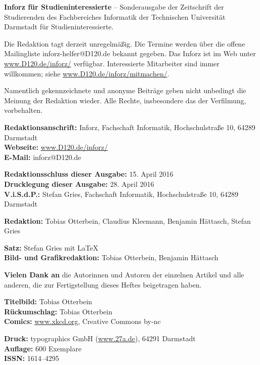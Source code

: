 \small

\textbf{Inforz für Studieninteressierte \the\year} – Sonderausgabe der Zeitschrift der Studierenden des Fachbereiches Informatik der Technischen Universität Darmstadt für Studieninteressierte.

\vspace{4mm}
Die Redaktion tagt derzeit unregelmäßig. Die Termine werden über die offene Mailingliste inforz-helfer@D120.de bekannt gegeben. Das Inforz ist  im Web unter \url{www.D120.de/inforz/} verfügbar. Interessierte Mitarbeiter sind immer willkommen; siehe  \url{www.D120.de/inforz/mitmachen/}.

\vspace{4mm}
Namentlich gekennzeichnete und anonyme Beiträge geben nicht unbedingt die Meinung der Redaktion wieder. Alle Rechte, insbesondere das der Verfilmung, vorbehalten.


\textbf{Redaktionsanschrift:} Inforz, Fachschaft Informatik, Hochschulstraße 10, 64289 Darmstadt\\
\textbf{Webseite:} \url{www.D120.de/inforz/}\\
\textbf{E-Mail:} inforz@D120.de

\vspace{4mm}
\textbf{Redaktionsschluss dieser Ausgabe:} 15. April 2016\\
\textbf{Drucklegung dieser Ausgabe:} 28. April 2016\\
\textbf{V.i.S.d.P.:} Stefan Gries, Fachschaft Informatik, Hochschulstraße 10, 64289 Darmstadt

\vspace{4mm}
\textbf{Redaktion:} Tobias Otterbein, Claudius Kleemann, Benjamin Hättasch, Stefan Gries

\vspace{4mm}
\textbf{Satz:} Stefan Gries mit \LaTeX\\
\textbf{Bild- und Grafikredaktion:} Tobias Otterbein, Benjamin Hättasch

\vspace{4mm}
\textbf{Vielen Dank an} die Autorinnen und Autoren der einzelnen Artikel und alle anderen, die zur Fertigstellung dieses Heftes beigetragen haben.

\vspace{4mm}
\textbf{Titelbild:} Tobias Otterbein\\
\textbf{Rückumschlag:} Tobias Otterbein\\
\textbf{Comics:} \url{www.xkcd.org}, Creative Commons by-nc

\vspace{4mm}
\textbf{Druck:} typographics GmbH (\url{www.27a.de}), 64291 Darmstadt\\
\textbf{Auflage:} 600 Exemplare\\
\textbf{ISSN:} 1614–4295

\newpage
